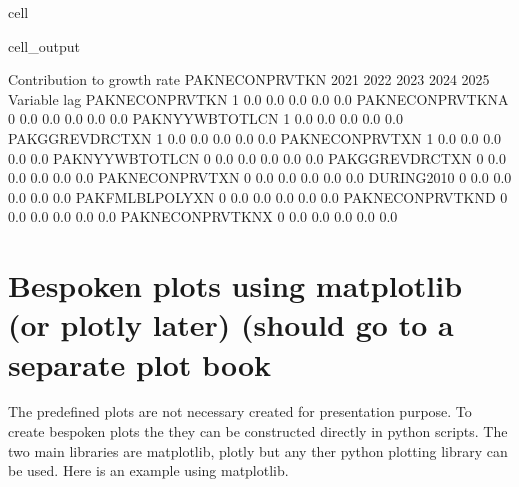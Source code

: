 \documentclass[letterpaper,10pt,english]{jupyterBook}
\begin{document}
\begin{sphinxuseclass}{cell}
\begin{sphinxVerbatimOutput}
\begin{sphinxuseclass}{cell_output}
\begin{sphinxVerbatim}[commandchars=\\\{\}]
 Contribution to growth rate PAKNECONPRVTKN
                            2021        2022        2023        2024        2025
Variable         lag                                                            
PAKNECONPRVTKN   \PYGZhy{}1         0.0\PYGZpc{}        0.0\PYGZpc{}        0.0\PYGZpc{}        0.0\PYGZpc{}        0.0\PYGZpc{}
PAKNECONPRVTKN\PYGZus{}A  0         0.0\PYGZpc{}        0.0\PYGZpc{}        0.0\PYGZpc{}        0.0\PYGZpc{}        0.0\PYGZpc{}
PAKNYYWBTOTLCN   \PYGZhy{}1         0.0\PYGZpc{}        0.0\PYGZpc{}       \PYGZhy{}0.0\PYGZpc{}       \PYGZhy{}0.0\PYGZpc{}       \PYGZhy{}0.0\PYGZpc{}
PAKGGREVDRCTXN   \PYGZhy{}1         0.0\PYGZpc{}        0.0\PYGZpc{}        0.0\PYGZpc{}        0.0\PYGZpc{}        0.0\PYGZpc{}
PAKNECONPRVTXN   \PYGZhy{}1         0.0\PYGZpc{}        0.0\PYGZpc{}        0.0\PYGZpc{}        0.0\PYGZpc{}        0.0\PYGZpc{}
PAKNYYWBTOTLCN    0        \PYGZhy{}0.0\PYGZpc{}        0.0\PYGZpc{}        0.0\PYGZpc{}        0.0\PYGZpc{}        0.0\PYGZpc{}
PAKGGREVDRCTXN    0         0.0\PYGZpc{}        0.0\PYGZpc{}        0.0\PYGZpc{}        0.0\PYGZpc{}        0.0\PYGZpc{}
PAKNECONPRVTXN    0        \PYGZhy{}0.0\PYGZpc{}       \PYGZhy{}0.0\PYGZpc{}       \PYGZhy{}0.0\PYGZpc{}       \PYGZhy{}0.0\PYGZpc{}       \PYGZhy{}0.0\PYGZpc{}
DURING\PYGZus{}2010       0         0.0\PYGZpc{}        0.0\PYGZpc{}        0.0\PYGZpc{}        0.0\PYGZpc{}        0.0\PYGZpc{}
PAKFMLBLPOLYXN    0        \PYGZhy{}0.0\PYGZpc{}       \PYGZhy{}0.0\PYGZpc{}       \PYGZhy{}0.0\PYGZpc{}       \PYGZhy{}0.0\PYGZpc{}       \PYGZhy{}0.0\PYGZpc{}
PAKNECONPRVTKN\PYGZus{}D  0         0.0\PYGZpc{}        0.0\PYGZpc{}        0.0\PYGZpc{}        0.0\PYGZpc{}        0.0\PYGZpc{}
PAKNECONPRVTKN\PYGZus{}X  0         0.0\PYGZpc{}        0.0\PYGZpc{}        0.0\PYGZpc{}        0.0\PYGZpc{}        0.0\PYGZpc{}
\end{sphinxVerbatim}

\end{sphinxuseclass}\end{sphinxVerbatimOutput}

\end{sphinxuseclass}

\section{Bespoken plots using matplotlib  (or plotly \sphinxhyphen{}later) (should go to a separate plot book}
\label{\detokenize{content/Python/modelflow_features:bespoken-plots-using-matplotlib-or-plotly-later-should-go-to-a-separate-plot-book}}
\sphinxAtStartPar
The predefined plots are not necessary created for presentation purpose. To create  bespoken plots the they can be
constructed directly in python scripts. The two main libraries are matplotlib, plotly but any ther python plotting library can be used. Here is an example using matplotlib.
\end{document}

